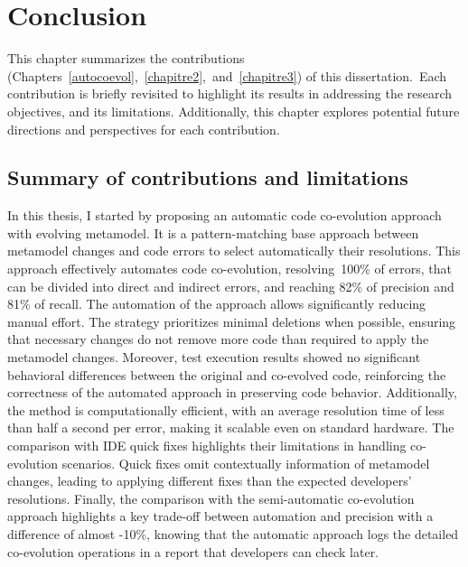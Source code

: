 \chapter{Conclusion}
This chapter summarizes the contributions (Chapters~\ref{autocoevol},~\ref{chapitre2},~and~\ref{chapitre3}) of this dissertation.~Each contribution is briefly revisited to highlight its results in addressing the research objectives, and its limitations. Additionally, this chapter explores potential future directions and perspectives for each contribution.%



\section{ Summary of contributions and limitations}
\label{Summaryandlimitations}
In this thesis, I started by proposing an automatic code co-evolution approach with evolving metamodel. It is a pattern-matching base approach between metamodel changes and code errors to select automatically their resolutions.
This approach effectively automates code co-evolution, resolving~100\% of errors, that can be divided into direct and indirect errors, and reaching 82\% of precision and 81\% of recall. The automation of the approach allows significantly reducing manual effort. The strategy prioritizes minimal deletions when possible, ensuring that necessary changes do not remove more code than required to apply the metamodel changes. Moreover, test execution results showed no significant behavioral differences between the original and co-evolved code, reinforcing the correctness of the automated approach in preserving code behavior. Additionally, the method is computationally efficient, with an average resolution time of less than half a second per error, making it scalable even on standard hardware. The comparison with IDE quick fixes highlights their limitations in handling co-evolution scenarios. Quick fixes omit contextually information of metamodel changes, leading to applying different fixes than the expected developers' resolutions.
Finally, the comparison with the semi-automatic co-evolution approach \cite{Khelladi2020} highlights a key trade-off between automation and precision with a difference of almost -10\%, knowing that the automatic approach logs the detailed co-evolution operations in a report that developers can check later. 

